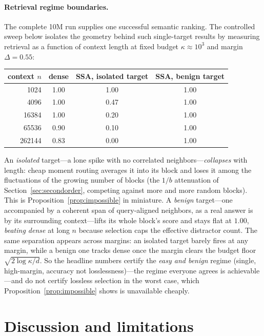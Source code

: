\documentclass[11pt]{article}
\numberwithin{equation}{section}
\begin{document}
\paragraph{Retrieval regime boundaries.} The complete 10M run supplies one successful semantic ranking. The
controlled sweep below isolates the geometry behind such single-target results by measuring retrieval as a
function of context length at fixed budget $\kappa\approx10^3$ and margin $\Delta=0.55$:

\begin{center}
\begin{tabular}{@{}rccc@{}}
\toprule
context $n$ & dense & SSA, isolated target & SSA, benign target\\
\midrule
1024   & 1.00 & 1.00 & 1.00\\
4096   & 1.00 & 0.47 & 1.00\\
16384  & 1.00 & 0.20 & 1.00\\
65536  & 0.90 & 0.10 & 1.00\\
262144 & 0.83 & 0.00 & 1.00\\
\bottomrule
\end{tabular}
\end{center}

An \emph{isolated} target---a lone spike with no correlated neighbors---\emph{collapses} with length: cheap
moment routing averages it into its block and loses it among the fluctuations of the growing number of blocks
(the $1/b$ attenuation of Section~\ref{sec:secondorder}, competing against more and more random blocks).
This is Proposition~\ref{prop:impossible} in miniature. A \emph{benign} target---one accompanied by a coherent
span of query-aligned neighbors, as a real answer is by its surrounding context---lifts its whole block's score
and stays flat at $1.00$, \emph{beating dense} at long $n$ because selection caps the effective distractor
count. The same separation appears across margins: an isolated target barely fires at any margin, while a
benign one tracks dense once the margin clears the budget floor $\sqrt{2\log\kappa/d}$. So the headline numbers
certify the \emph{easy and benign} regime (single, high-margin, accuracy not losslessness)---the regime
everyone agrees is achievable---and do not certify lossless selection in the worst case, which
Proposition~\ref{prop:impossible} shows is unavailable cheaply.

\section{Discussion and limitations}
\end{document}
